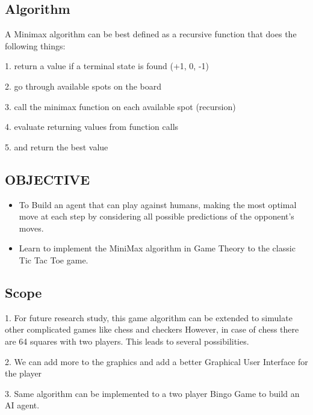 \documentclass[a4paper, 12pt]{article}
\begin{document}
\subsection{Algorithm}
A Minimax algorithm can be best defined as a recursive function that does the following things:
\item 1. return a value if a terminal state is found (+1, 0, -1)
\item 2. go through available spots on the board

\item 3. call the minimax function on each available spot (recursion)

\item 4. evaluate returning values from function calls

\item 5. and return the best value

  


\newpage
\begin{center}
\section{OBJECTIVE}
\end{center}
\begin{itemize}
    \item To Build an agent that can play against humans, making the most optimal move at each step by considering all possible predictions of the opponent's moves.

    \item Learn to implement the MiniMax algorithm in Game Theory to the classic Tic Tac Toe game.
	

\end{itemize}


\newpage
\begin{center}
\section{Scope}
\end{center}
\item 1. For future research study, this game algorithm can be extended to simulate other complicated games like chess and checkers However, in case of chess there are 64 squares with two players. This leads to several possibilities.
\item 2. We can add more to the graphics and add a better Graphical User Interface for the player
\item 3. Same algorithm can be implemented to a two player Bingo Game to build an AI agent.
\end{document}
